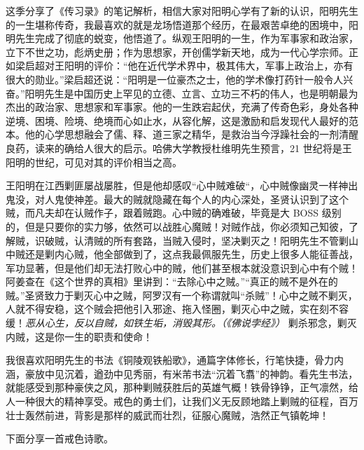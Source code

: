 这季分享了《传习录》的笔记解析，相信大家对阳明心学有了新的认识，阳明先生的一生堪称传奇，我最喜欢的就是龙场悟道那个经历，在最艰苦卓绝的困境中，阳明先生完成了彻底的蜕变，他悟道了。纵观王阳明的一生，作为军事家和政治家，立下不世之功，彪炳史册；作为思想家，开创儒学新天地，成为一代心学宗师。正如梁启超对王阳明的评价：“他在近代学术界中，极其伟大，军事上政治上，亦有很大的勋业。”梁启超还说：“阳明是一位豪杰之士，他的学术像打药针一般令人兴奋。”阳明先生是中国历史上罕见的立德、立言、立功三不朽的伟人，也是明朝最为杰出的政治家、思想家和军事家。他的一生跌宕起伏，充满了传奇色彩，身处各种逆境、困境、险境、绝境而心如止水，从容化解，这是激励和启发现代人最好的范本。他的心学思想融会了儒、释、道三家之精华，是救治当今浮躁社会的一剂清醒良药，读来的确给人很大的启示。哈佛大学教授杜维明先生预言，21 世纪将是王阳明的世纪，可见对其的评价相当之高。

王阳明在江西剿匪屡战屡胜，但是他却感叹“心中贼难破“，心中贼像幽灵一样神出鬼没，对人鬼使神差。最大的贼就隐藏在每个人的内心深处，圣贤认识到了这个贼，而凡夫却在认贼作子，跟着贼跑。心中贼的确难破，毕竟是大 BOSS 级别的，但是只要你的实力够，依然可以战胜心魔贼！对贼作战，你必须知己知彼，了解贼，识破贼，认清贼的所有套路，当贼入侵时，坚决剿灭之！阳明先生不管剿山中贼还是剿内心贼，他全部做到了，这点我最佩服先生，历史上很多人能征善战，军功显著，但是他们却无法打败心中的贼，他们甚至根本就没意识到心中有个贼！阿姜查在《这个世界的真相》里讲到：“去除心中之贼。”“真正的贼不是外在的贼。”圣贤致力于剿灭心中之贼，阿罗汉有一个称谓就叫“杀贼”！心中之贼不剿灭，人就不得安稳，这个贼会把他引入邪途、拖入怪圈，剿灭心中之贼，实在刻不容缓！\textit{恶从心生，反以自贼，如铁生垢，消毁其形。（《佛说孛经》）} 剿杀邪念，剿灭内贼，这是你一生的职责和使命！

我很喜欢阳明先生的书法《铜陵观铁船歌》，通篇字体修长，行笔快捷，骨力内涵，豪放中见沉着，遒劲中见秀丽，有米芾书法“沉着飞翥”的神韵。看先生书法，就能感受到那种豪侠之风，那种剿贼获胜后的英雄气概！铁骨铮铮，正气凛然，给人一种很大的精神享受。戒色的勇士们，让我们义无反顾地踏上剿贼的征程，百万壮士轰然前进，背影是那样的威武而壮烈，征服心魔贼，浩然正气镇乾坤！

下面分享一首戒色诗歌。

